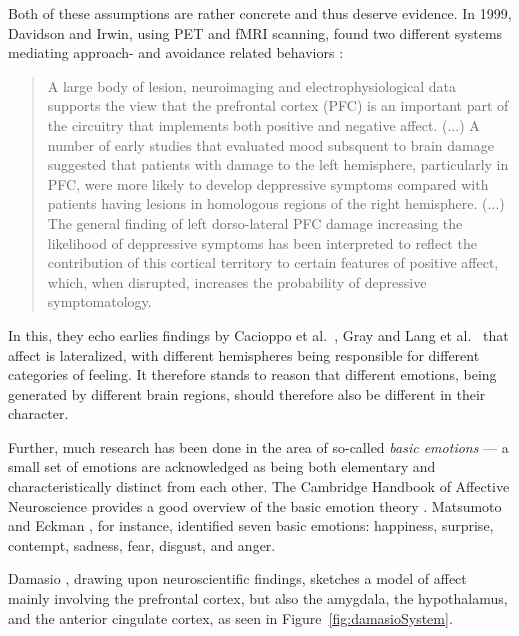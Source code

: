 Both of these assumptions are rather concrete and thus deserve evidence. In 1999, Davidson and Irwin, using PET and fMRI scanning, found two different systems mediating approach- and avoidance related behaviors \cite[p. 13]{davidson1999}:

\begin{quote}
A large body of lesion, neuroimaging and electrophysiological data supports the view that the prefrontal cortex (PFC) is an important part of the circuitry that implements both positive and negative affect. ($\dots$)
A number of early studies that evaluated mood subsquent to brain damage suggested that patients with damage to the left hemisphere, particularly in PFC, were more likely to develop deppressive symptoms compared with patients having lesions in homologous regions of the right hemisphere. ($\dots$)
The general finding of left dorso-lateral PFC damage increasing the likelihood of deppressive symptoms has been interpreted to reflect the contribution of this cortical territory to certain features of positive affect, which, when disrupted, increases the probability of depressive symptomatology.
\end{quote}

In this, they echo earlies findings by Cacioppo et al.\ \cite{cacioppo1999}, Gray \cite{gray1994} and Lang et al.\ \cite{lang1990} that affect is lateralized, with different hemispheres being responsible for different categories of feeling. It therefore stands to reason that different emotions, being generated by different brain regions, should therefore also be different in their character.

Further, much research has been done in the area of so-called {\em basic emotions} --- a small set of emotions are acknowledged as being both elementary and characteristically distinct from each other. The Cambridge Handbook of Affective Neuroscience provides a good overview of the basic emotion theory \cite[pp. 9-10]{cambridgeAff}. Matsumoto and Eckman \cite{matsumoto2009}, for instance, identified seven basic emotions: happiness, surprise, contempt, sadness, fear, disgust, and anger.

Damasio \cite{damasio1998}, drawing upon neuroscientific findings, sketches a model of affect mainly involving the prefrontal cortex, but also the amygdala, the hypothalamus, and the anterior cingulate cortex, as seen in Figure~\ref{fig:damasioSystem}.

